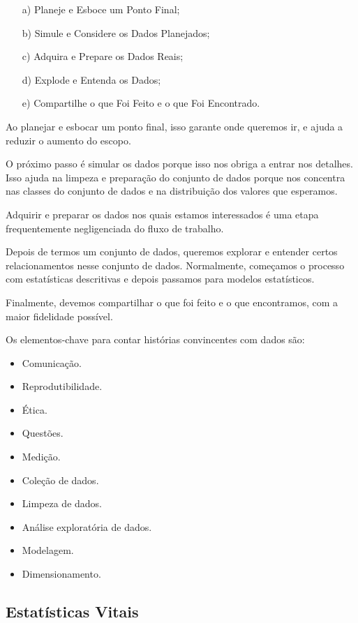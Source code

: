 \begin{itemize}
\item[{a)}] Planeje e Esboce um Ponto Final;
\item[{b)}] Simule e Considere os Dados Planejados;
\item[{c)}] Adquira e Prepare os Dados Reais;
\item[{d)}] Explode e Entenda os Dados;
\item[{e)}] Compartilhe o que Foi Feito e o que Foi Encontrado.
\end{itemize}

Ao planejar e esbocar um ponto final, isso garante onde queremos ir, e ajuda a reduzir o aumento do escopo.\vskip0.3cm

O próximo passo é simular os dados porque isso nos obriga a entrar nos detalhes. Isso ajuda na limpeza e preparação do conjunto de dados porque nos concentra nas classes do conjunto de dados e na distribuição dos valores que esperamos.\vskip0.3cm

Adquirir e preparar os dados nos quais estamos interessados ​​é uma etapa frequentemente negligenciada do fluxo de trabalho. \vskip0.3cm

Depois de termos um conjunto de dados, queremos explorar e entender certos relacionamentos nesse conjunto de dados. Normalmente, começamos o processo com estatísticas descritivas e depois passamos para modelos estatísticos.\vskip0.3cm

Finalmente, devemos compartilhar o que foi feito e o que encontramos, com a maior fidelidade possível.\vskip0.3cm


Os elementos-chave para contar histórias convincentes com dados são:

\begin{itemize}
\item Comunicação.
\item Reprodutibilidade.
\item Ética.
\item Questões.
\item Medição.
\item Coleção de dados.
\item Limpeza de dados.
\item Análise exploratória de dados.
\item Modelagem.
\item Dimensionamento.
\end{itemize}



\newpage
\subsection{Estatísticas Vitais}

